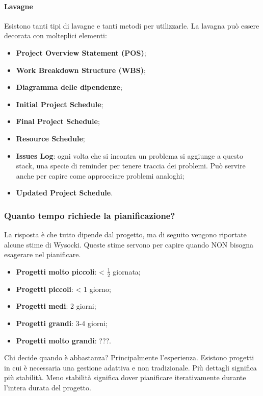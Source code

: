 \paragraph{Lavagne}
Esistono tanti tipi di lavagne e tanti metodi per utilizzarle. La lavagna può essere decorata con molteplici elementi:
\begin{itemize}
	\item \textbf{Project Overview Statement (POS)};
	\item \textbf{Work Breakdown Structure (WBS)};
	\item \textbf{Diagramma delle dipendenze};
	\item \textbf{Initial Project Schedule};
	\item \textbf{Final Project Schedule};
	\item \textbf{Resource Schedule};
	\item \textbf{Issues Log}: ogni volta che si incontra un problema si aggiunge a questo stack, una specie di reminder per tenere traccia dei problemi. Può servire anche per capire come approcciare problemi analoghi;
	\item \textbf{Updated Project Schedule}.
\end{itemize}

\subsubsection{Quanto tempo richiede la pianificazione?}
La risposta è che tutto dipende dal progetto, ma di seguito vengono riportate alcune stime di Wysocki. Queste stime servono per capire quando NON bisogna esagerare nel pianificare.
\begin{itemize}
	\item \textbf{Progetti molto piccoli}: < $\frac{1}{2}$ giornata;
	\item \textbf{Progetti piccoli}: < 1 giorno;
	\item \textbf{Progetti medi}: 2 giorni;
	\item \textbf{Progetti grandi}: 3-4 giorni;
	\item \textbf{Progetti molto grandi}: ???.
\end{itemize}
Chi decide quando è abbastanza? Principalmente l'esperienza. Esistono progetti in cui è necessaria una gestione adattiva e non tradizionale. Più dettagli significa più stabilità. Meno stabilità significa dover pianificare iterativamente durante l'intera durata del progetto.
